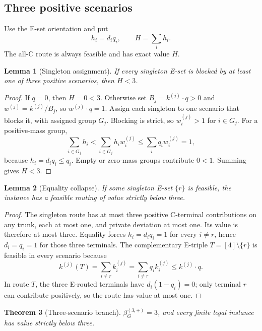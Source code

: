 \documentclass[11pt]{article}
\newtheorem{theorem}{Theorem}[section]
\newtheorem{lemma}[theorem]{Lemma}
\theoremstyle{remark}
\begin{document}
\subsection{Three positive scenarios}

Use the E-set orientation and put
\[
h_i=d_iq_i,\qquad H=\sum_i h_i.
\tag{3.3}
\]
The all-C route is always feasible and has exact value $H$.

\begin{lemma}[Singleton assignment]\label{lem:assign}
If every singleton E-set is blocked by at least one of three positive
scenarios, then $H<3$.
\end{lemma}

\begin{proof}
If $q=0$, then $H=0<3$. Otherwise set
$B_j=k^{(j)}\cdot q>0$ and $w^{(j)}=k^{(j)}/B_j$, so
$w^{(j)}\cdot q=1$. Assign each singleton to one scenario that blocks it, with
assigned group $G_j$. Blocking is strict, so $w_i^{(j)}>1$ for $i\in G_j$.
For a positive-mass group,
\[
\sum_{i\in G_j}h_i
<\sum_{i\in G_j}h_iw_i^{(j)}
\le\sum_iq_iw_i^{(j)}=1,
\tag{3.4}
\]
because $h_i=d_iq_i\le q_i$. Empty or zero-mass groups contribute $0<1$.
Summing gives $H<3$.
\end{proof}

\begin{lemma}[Equality collapse]\label{lem:collapse}
If some singleton E-set $\{r\}$ is feasible, the instance has a feasible
routing of value strictly below three.
\end{lemma}

\begin{proof}
The singleton route has at most three positive C-terminal contributions on
any trunk, each at most one, and private deviation at most one. Its value is
therefore at most three. Equality forces $h_i=d_iq_i=1$ for every $i\ne r$,
hence $d_i=q_i=1$ for those three terminals. The complementary E-triple
$T=[4]\setminus\{r\}$ is feasible in every scenario because
\[
k^{(j)}(T)=\sum_{i\ne r}k_i^{(j)}
=\sum_{i\ne r}q_ik_i^{(j)}\le k^{(j)}\cdot q.
\tag{3.5}
\]
In route $T$, the three E-routed terminals have
$d_i(1-q_i)=0$; only terminal $r$ can contribute positively, so the route has
value at most one.
\end{proof}

\begin{theorem}[Three-scenario branch]\label{thm:m3}
$\beta_G^{(3,+)}=3$, and every finite legal instance has value strictly below
three.
\end{theorem}
\end{document}
